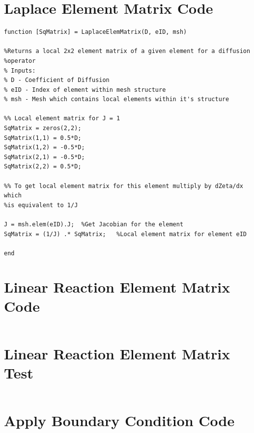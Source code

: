 \documentclass[11pt]{article}
\begin{document}
\begin{appendices}
\section{Laplace Element Matrix Code}
\begin{lstlisting}
function [SqMatrix] = LaplaceElemMatrix(D, eID, msh)

%Returns a local 2x2 element matrix of a given element for a diffusion
%operator
% Inputs: 
% D - Coefficient of Diffusion
% eID - Index of element within mesh structure
% msh - Mesh which contains local elements within it's structure

%% Local element matrix for J = 1
SqMatrix = zeros(2,2);
SqMatrix(1,1) = 0.5*D;
SqMatrix(1,2) = -0.5*D;
SqMatrix(2,1) = -0.5*D;
SqMatrix(2,2) = 0.5*D;

%% To get local element matrix for this element multiply by dZeta/dx which
%is equivalent to 1/J 

J = msh.elem(eID).J;  %Get Jacobian for the element
SqMatrix = (1/J) .* SqMatrix;   %Local element matrix for element eID

end
\end{lstlisting}
\pagebreak
\section{Linear Reaction Element Matrix Code} \label{ap:ReactCode}
\begin{lstlisting}
\end{lstlisting}
\pagebreak
\section{Linear Reaction Element Matrix Test} \label{ap:ReactTest}
\begin{lstlisting}
\end{lstlisting}
\pagebreak
\section{Apply Boundary Condition Code} \label{ap:BC}
\begin{lstlisting}
\end{lstlisting}
\pagebreak






\end{appendices}
\end{document}
